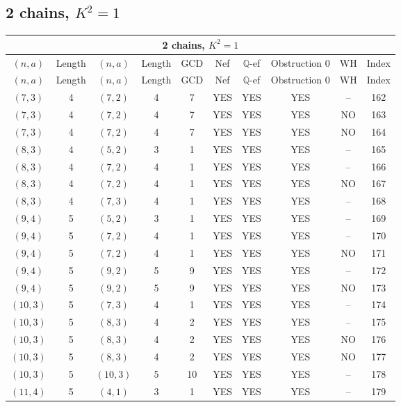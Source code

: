\subsection{2 chains, $K^2 = 1$}
\begin{longtable}{|c|c|c|c|c|c|c|c|c|c|}
\hline
\multicolumn{10}{|c|}{2 chains, $K^2 = 1$}\\
\hline
$(n,a)$ & Length & $(n,a)$ & Length & GCD & Nef & $\mathbb Q$-ef & Obstruction 0 & WH & Index\\
\hline
\endfirsthead

\hline
$(n,a)$ & Length & $(n,a)$ & Length & GCD & Nef & $\mathbb Q$-ef & Obstruction 0 & WH & Index\\
\hline
\endhead
\hline
\endfoot

$(7, 3)$ & 4 & $(7, 2)$ & 4 & 7 & YES & YES & YES & -- & 162\\
$(7, 3)$ & 4 & $(7, 2)$ & 4 & 7 & YES & YES & YES & NO & 163\\
$(7, 3)$ & 4 & $(7, 2)$ & 4 & 7 & YES & YES & YES & NO & 164\\
$(8, 3)$ & 4 & $(5, 2)$ & 3 & 1 & YES & YES & YES & -- & 165\\
$(8, 3)$ & 4 & $(7, 2)$ & 4 & 1 & YES & YES & YES & -- & 166\\
$(8, 3)$ & 4 & $(7, 2)$ & 4 & 1 & YES & YES & YES & NO & 167\\
$(8, 3)$ & 4 & $(7, 3)$ & 4 & 1 & YES & YES & YES & -- & 168\\
$(9, 4)$ & 5 & $(5, 2)$ & 3 & 1 & YES & YES & YES & -- & 169\\
$(9, 4)$ & 5 & $(7, 2)$ & 4 & 1 & YES & YES & YES & -- & 170\\
$(9, 4)$ & 5 & $(7, 2)$ & 4 & 1 & YES & YES & YES & NO & 171\\
$(9, 4)$ & 5 & $(9, 2)$ & 5 & 9 & YES & YES & YES & -- & 172\\
$(9, 4)$ & 5 & $(9, 2)$ & 5 & 9 & YES & YES & YES & NO & 173\\
$(10, 3)$ & 5 & $(7, 3)$ & 4 & 1 & YES & YES & YES & -- & 174\\
$(10, 3)$ & 5 & $(8, 3)$ & 4 & 2 & YES & YES & YES & -- & 175\\
$(10, 3)$ & 5 & $(8, 3)$ & 4 & 2 & YES & YES & YES & NO & 176\\
$(10, 3)$ & 5 & $(8, 3)$ & 4 & 2 & YES & YES & YES & NO & 177\\
$(10, 3)$ & 5 & $(10, 3)$ & 5 & 10 & YES & YES & YES & -- & 178\\
$(11, 4)$ & 5 & $(4, 1)$ & 3 & 1 & YES & YES & YES & -- & 179\\

\end{longtable}
